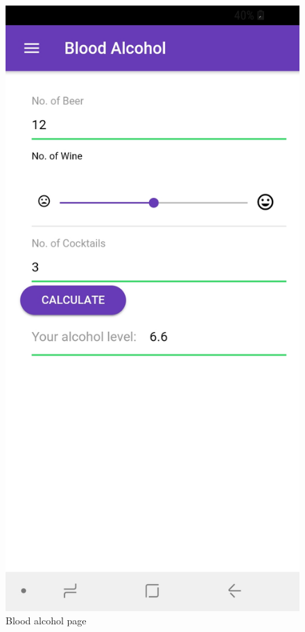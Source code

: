 \documentclass[12pt]{article}
\begin{document}
\begin{figure}[H]
  \includegraphics[width=\linewidth]{figures/Calc_alc.jpg}
  \caption{Blood alcohol page}\label{fig:awesome_image1}

\end{figure}
\end{document}
